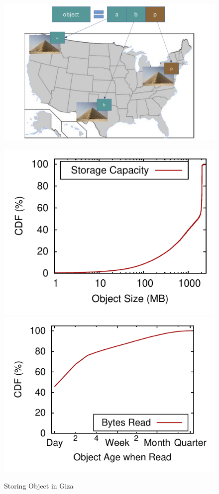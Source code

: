 

\begin{figure}[!htbp]
\centering
\begin{minipage}{0.3\textwidth}%
\centering
\includegraphics[width=\textwidth]{fig/giza_example_crop_fit}
\caption{Storing Object in Giza}
\label{fig:giza_example}
\end{minipage}%
\begin{minipage}{0.7\textwidth}%
\captionsetup{type=figure}
\centering
		\hspace{-1.5em}
    \subcaptionbox{\label{fig:object_size-storage_capacity}}
      {\includegraphics[height=0.275\textwidth]{data/object_size-storage_capacity}}%
		\hspace{-1em}
    \subcaptionbox{\label{fig:write_read_gap-bytes_read}}
      {\includegraphics[height=0.275\textwidth]{data/write_read_gap-bytes_read}}%

\end{minipage}
\end{figure}

